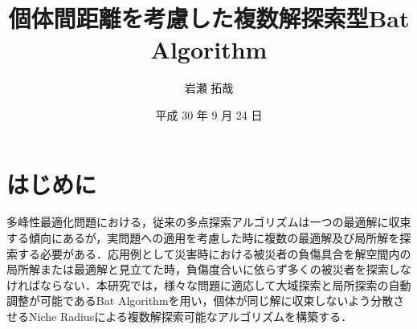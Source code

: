 \documentclass[twocolumn, a4paper]{UECIEresume}
\title{個体間距離を考慮した複数解探索型Bat Algorithm}
\date{平成 30 年 9 月 24 日}
\affiliation{情報学専攻 メディア情報学 プログラム}
\author{岩瀬 拓哉}
\begin{document}
\maketitle

\section{はじめに}
多峰性最適化問題における，従来の多点探索アルゴリズムは一つの最適解に収束する傾向にあるが，実問題への適用を考慮した時に複数の最適解及び局所解を探索する必要がある．応用例として災害時における被災者の負傷具合を解空間内の局所解または最適解と見立てた時，負傷度合いに依らず多くの被災者を探索しなければならない．本研究では，様々な問題に適応して大域探索と局所探索の自動調整が可能であるBat Algorithmを用い，個体が同じ解に収束しないよう分散させるNiche Radiusによる複数解探索可能なアルゴリズムを構築する．
\end{document}
